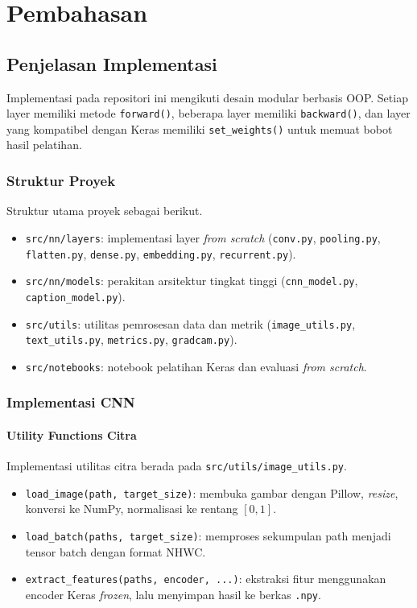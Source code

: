 
\chapter{Pembahasan}

\section{Penjelasan Implementasi}

Implementasi pada repositori ini mengikuti desain modular berbasis OOP. Setiap layer memiliki metode \texttt{forward()}, beberapa layer memiliki \texttt{backward()}, dan layer yang kompatibel dengan Keras memiliki \texttt{set\_weights()} untuk memuat bobot hasil pelatihan.

\subsection{Struktur Proyek}

Struktur utama proyek sebagai berikut.

\begin{itemize}
    \item \texttt{src/nn/layers}: implementasi layer \textit{from scratch} (\texttt{conv.py}, \texttt{pooling.py}, \texttt{flatten.py}, \texttt{dense.py}, \texttt{embedding.py}, \texttt{recurrent.py}).
    \item \texttt{src/nn/models}: perakitan arsitektur tingkat tinggi (\texttt{cnn\_model.py}, \texttt{caption\_model.py}).
    \item \texttt{src/utils}: utilitas pemrosesan data dan metrik (\texttt{image\_utils.py}, \texttt{text\_utils.py}, \texttt{metrics.py}, \texttt{gradcam.py}).
    \item \texttt{src/notebooks}: notebook pelatihan Keras dan evaluasi \textit{from scratch}.
\end{itemize}

\subsection{Implementasi CNN}

\subsubsection{Utility Functions Citra}
Implementasi utilitas citra berada pada \texttt{src/utils/image\_utils.py}.

\begin{itemize}
    \item \texttt{load\_image(path, target\_size)}: membuka gambar dengan Pillow, \textit{resize}, konversi ke NumPy, normalisasi ke rentang $[0,1]$.
    \item \texttt{load\_batch(paths, target\_size)}: memproses sekumpulan path menjadi tensor batch dengan format NHWC.
    \item \texttt{extract\_features(paths, encoder, ...)}: ekstraksi fitur menggunakan encoder Keras \textit{frozen}, lalu menyimpan hasil ke berkas \texttt{.npy}.
\end{itemize}

